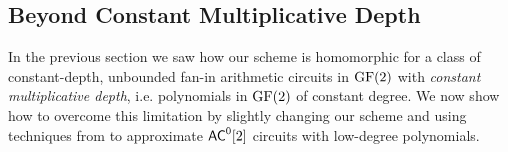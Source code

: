 \subsection{Beyond Constant Multiplicative Depth}
\label{sec:beyond-cm}

In the previous section we saw how our scheme is homomorphic for a class of constant-depth, unbounded fan-in arithmetic circuits in $\text{GF}(2)$ with \textit{constant multiplicative depth}, i.e. polynomials in $\text{GF}(2)$ of constant degree. We now show how to overcome this limitation by slightly changing our scheme and using techniques from  \cite{razborov1987lower} to approximate ${\mathsf{AC}}^0[2]$ circuits with low-degree polynomials.




